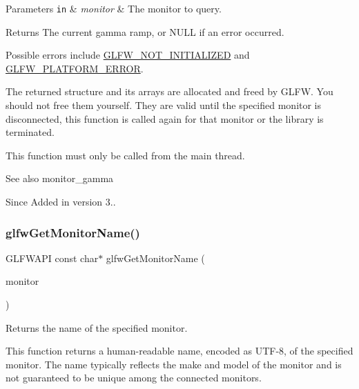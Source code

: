 \begin{DoxyParams}[1]{Parameters}
\mbox{\tt in}  & {\em monitor} & The monitor to query. \\
\hline
\end{DoxyParams}
\begin{DoxyReturn}{Returns}
The current gamma ramp, or {\ttfamily N\+U\+LL} if an error occurred.
\end{DoxyReturn}
Possible errors include \hyperlink{group__errors_ga2374ee02c177f12e1fa76ff3ed15e14a}{G\+L\+F\+W\+\_\+\+N\+O\+T\+\_\+\+I\+N\+I\+T\+I\+A\+L\+I\+Z\+ED} and \hyperlink{group__errors_gad44162d78100ea5e87cdd38426b8c7a1}{G\+L\+F\+W\+\_\+\+P\+L\+A\+T\+F\+O\+R\+M\+\_\+\+E\+R\+R\+OR}.

The returned structure and its arrays are allocated and freed by G\+L\+FW. You should not free them yourself. They are valid until the specified monitor is disconnected, this function is called again for that monitor or the library is terminated.

This function must only be called from the main thread.

\begin{DoxySeeAlso}{See also}
monitor\+\_\+gamma
\end{DoxySeeAlso}
\begin{DoxySince}{Since}
Added in version 3.. 
\end{DoxySince}
\mbox{\label{group__monitor_ga22f62011bae33ea8d2974eff5d14f9b8}} 
\subsubsection{\texorpdfstring{glfw\+Get\+Monitor\+Name()}{glfwGetMonitorName()}}
{\footnotesize\ttfamily G\+L\+F\+W\+A\+PI const char$\ast$ glfw\+Get\+Monitor\+Name (\begin{DoxyParamCaption}\item[{\hyperlink{group__monitor_ga8d9efd1cde9426692c73fe40437d0ae3}{G\+L\+F\+Wmonitor} $\ast$}]{monitor }\end{DoxyParamCaption})}



Returns the name of the specified monitor. 

This function returns a human-\/readable name, encoded as U\+T\+F-\/8, of the specified monitor. The name typically reflects the make and model of the monitor and is not guaranteed to be unique among the connected monitors.


